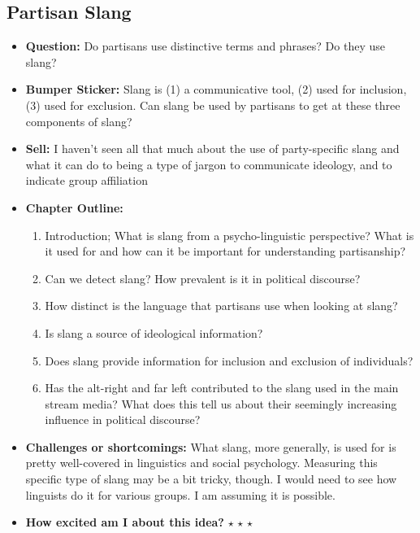 \documentclass[12pt]{article}
\begin{document}
\subsection{Partisan Slang}
    \begin{itemize}
        \item \textbf{Question:} Do partisans use distinctive terms and phrases? Do they use slang?
        \item \textbf{Bumper Sticker:} Slang is (1) a communicative tool, (2) used for inclusion, (3) used for exclusion. Can slang be used by partisans to get at these three components of slang?
        \item \textbf{Sell:} I haven't seen all that much about the use of party-specific slang and what it can do to being a type of jargon to communicate ideology, and to indicate group affiliation
        \item \textbf{Chapter Outline:}
        \begin{enumerate}
            \item Introduction; What is slang from a psycho-linguistic perspective? What is it used for and how can it be important for understanding partisanship?
            \item Can we detect slang? How prevalent is it in political discourse?
            \item How distinct is the language that partisans use when looking at slang?
            \item Is slang a source of ideological information?
            \item Does slang provide information for inclusion and exclusion of individuals?
            \item Has the alt-right and far left contributed to the slang used in the main stream media? What does this tell us about their seemingly increasing influence in political discourse?
        \end{enumerate}
        \item \textbf{Challenges or shortcomings:} What slang, more generally, is used for is pretty well-covered in linguistics and social psychology. Measuring this specific type of slang may be a bit tricky, though. I would need to see how linguists do it for various groups. I am assuming it is possible.
        \item \textbf{How excited am I about this idea?} $\star$ $\star$ $\star$
    \end{itemize}
\end{document}
